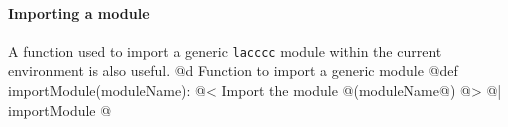\documentclass[11pt,oneside]{article}	%
\begin{document}
\paragraph{Importing a module} A function used to import a generic \texttt{lacccc} module within the current environment is also useful.
@d Function to import a generic module
@{def importModule(moduleName):
	@< Import the module @(moduleName@) @>
@| importModule @}






\end{document}
